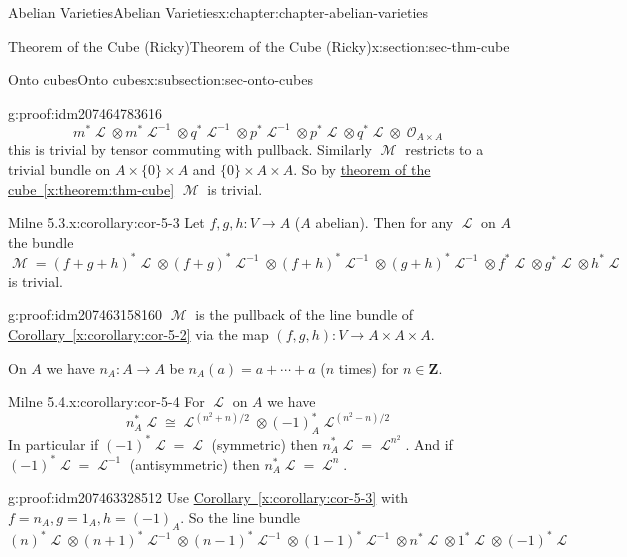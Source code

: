 \documentclass[oneside,10pt,]{book}
\numberwithin{equation}{section}
\newcommand{\sheaf}[1]{\operatorname{\mathcal{#1}}}
\newcommand{\ZZ}{\mathbf{Z}}
\begin{document}
\begin{chapterptx}{Abelian Varieties}{}{Abelian Varieties}{}{}{x:chapter:chapter-abelian-varieties}
\begin{sectionptx}{Theorem of the Cube (Ricky)}{}{Theorem of the Cube (Ricky)}{}{}{x:section:sec-thm-cube}
\begin{subsectionptx}{Onto cubes}{}{Onto cubes}{}{}{x:subsection:sec-onto-cubes}
\begin{proofptx}{}{g:proof:idm207464783616}
\begin{equation*}
m^* \sheaf L \otimes m^* \sheaf L^{-1} \otimes q^* \sheaf L^{-1} \otimes p^*\sheaf L^{-1} \otimes p^*\sheaf L \otimes q^*\sheaf L \otimes \sheaf O_{A\times A}
\end{equation*}
this is trivial by tensor commuting with pullback. Similarly \(\sheaf M\) restricts to a trivial bundle on \(A\times \{0\} \times A\) and \(\{0\}\times A \times A\). So by \hyperref[x:theorem:thm-cube]{theorem of the cube~\ref{x:theorem:thm-cube}} \(\sheaf M\) is trivial.%
\end{proofptx}
\begin{corollary}{Milne 5.3.}{}{x:corollary:cor-5-3}%
Let \(f,g, h\colon V \to A\) (\(A\) abelian). Then for any \(\sheaf L\) on \(A\) the bundle%
\begin{equation*}
\sheaf M  = (f+g+h)^*\sheaf L \otimes (f+g)^*\sheaf L^{-1}\otimes (f+h)^*\sheaf L^{-1}\otimes (g+h)^*\sheaf L^{-1} \otimes   f^*\sheaf L \otimes   g^*\sheaf L \otimes   h^*\sheaf L
\end{equation*}
is trivial.%
\end{corollary}
\begin{proofptx}{}{g:proof:idm207463158160}
\(\sheaf M\) is the pullback of the line bundle of \hyperref[x:corollary:cor-5-2]{Corollary~\ref{x:corollary:cor-5-2}} via the map \((f,g,h) \colon V \to A\times A\times A\).%
\end{proofptx}
On \(A\) we have \(n_A \colon A\to A\) be \(n_A(a) = a+\cdots + a\) (\(n\) times) for \(n\in \ZZ\).%
\begin{corollary}{Milne 5.4.}{}{x:corollary:cor-5-4}%
For \(\sheaf L\) on \(A\) we have%
\begin{equation*}
n^*_A\sheaf L \cong \sheaf L^{(n^2 + n)/2} \otimes (-1)_A^* \sheaf L^{(n^2 - n)/2}
\end{equation*}
In particular if \((-1)^* \sheaf L = \sheaf L\) (symmetric) then \(n_A^* \sheaf L = \sheaf L^{n^2}\). And if \((-1)^* \sheaf L = \sheaf L^{-1}\) (antisymmetric) then \(n_A^* \sheaf L = \sheaf L^{n}\).%
\end{corollary}
\begin{proofptx}{}{g:proof:idm207463328512}
Use \hyperref[x:corollary:cor-5-3]{Corollary~\ref{x:corollary:cor-5-3}} with \(f= n_A, g = 1_A, h = (-1)_A\). So the line bundle%
\begin{equation*}
(n)^*\sheaf L \otimes (n+1)^*\sheaf L^{-1}\otimes (n-1)^*\sheaf L^{-1}\otimes (1-1)^*\sheaf L^{-1} \otimes   n^*\sheaf L \otimes   1^*\sheaf L \otimes   (-1)^*\sheaf L
\end{equation*}

\end{proofptx}
\end{subsectionptx}
\end{sectionptx}
\end{chapterptx}
\end{document}
